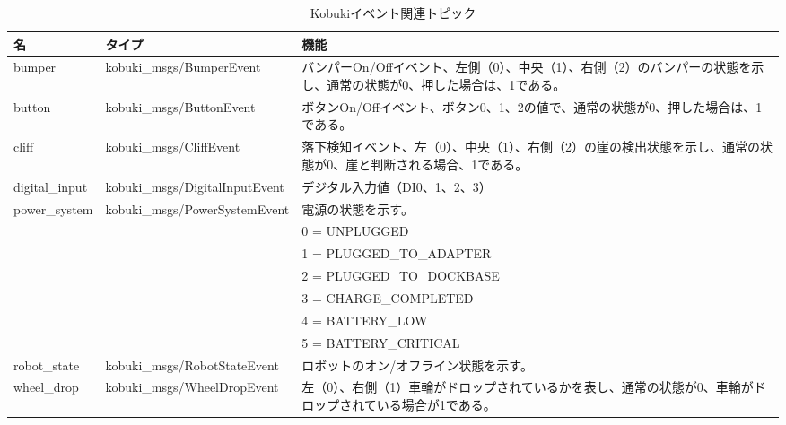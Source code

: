 \begin{table}[htp]
\centering
\begin{tabular}{p{2cm} p{5cm} p{6cm}}
\toprule
\textbf{名} & \textbf{タイプ} & \textbf{機能}\\
\midrule
bumper & kobuki\_msgs/BumperEvent & バンパーOn/Offイベント、左側（0）、中央（1）、右側（2）のバンパーの状態を示し、通常の状態が0、押した場合は、1である。\\
button & kobuki\_msgs/ButtonEvent & ボタンOn/Offイベント、ボタン0、1、2の値で、通常の状態が0、押した場合は、1である。\\
cliff & kobuki\_msgs/CliffEvent  & 落下検知イベント、左（0）、中央（1）、右側（2）の崖の検出状態を示し、通常の状態が0、崖と判断される場合、1である。 \\
digital\_input & kobuki\_msgs/DigitalInputEvent & デジタル入力値（DI0、1、2、3） \\
power\_system & kobuki\_msgs/PowerSystemEvent  & 電源の状態を示す。 \\
& & 0 = UNPLUGGED \\
& & 1 = PLUGGED\_TO\_ADAPTER \\
& & 2 = PLUGGED\_TO\_DOCKBASE \\
& & 3 = CHARGE\_COMPLETED  \\
& & 4 = BATTERY\_LOW \\
& & 5 = BATTERY\_CRITICAL \\
robot\_state & kobuki\_msgs/RobotStateEvent & ロボットのオン/オフライン状態を示す。\\
wheel\_drop  & kobuki\_msgs/WheelDropEvent  & 左（0）、右側（1）車輪がドロップされているかを表し、通常の状態が0、車輪がドロップされている場合が1である。\\
\bottomrule
\end{tabular}
\caption{Kobukiイベント関連トピック}
\end{table}


